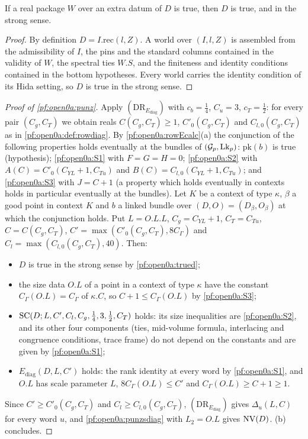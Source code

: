 \begin{lemma}\label{pf:open0a:trued}
If a real package $W$ over an extra datum of $D$ is true, then $D$ is true, and in the strong sense.
\ 
\end{lemma}

\begin{proof}
By definition $D=I.\mathrm{rec}(l,Z)$. A world over $(I,l,Z)$ is assembled from the admissibility of $I$, the pins
and the standard columns contained in the validity of $W$, the spectral ties $W.S$, and the finiteness and identity
conditions contained in the bottom hypotheses. Every world carries the identity condition of its Hida setting, so $D$
is true in the strong sense.
\end{proof}

\begin{proof}[Proof of \cref{pf:open0a:punz}]
Apply $(\mathrm{DR}_{E_{\mathrm{diag}}})$ with $c_b=\frac14$, $C_u=3$, $c_T=\frac12$: for every pair $(C_g,C_T)$ we
obtain reals $C(C_g,C_T)\ge1$, $C'_0(C_g,C_T)$ and $C_{l,0}(C_g,C_T)$ as in \cref{pf:open0a:def:rowdiag}. By
\cref{pf:open0a:rowEcalc}(a) the conjunction of the following properties holds eventually at the bundles of
$(\mathcal G_p,\mathrm{Lk}_p)$: $\mathrm{pk}(b)$ is true (hypothesis); \ref{pf:open0a:S1} with $F=G=H=0$;
\ref{pf:open0a:S2} with $A(C)=C'_0(C_{YL}+1,C_{Tu})$ and $B(C)=C_{l,0}(C_{YL}+1,C_{Tu})$; and \ref{pf:open0a:S3} with
$J=C+1$ (a property which holds eventually in contexts holds in particular eventually at the bundles). Let $K$ be a
context of type $\kappa$, $\beta$ a good point in context $K$ and $b$ a linked bundle over $(D,O)=(D_\beta,O_\beta)$
at which the conjunction holds. Put $L=O.L.L$, $C_g=C_{YL}+1$, $C_T=C_{Tu}$, $C=C(C_g,C_T)$,
$C'=\max(C'_0(C_g,C_T),8C_\Gamma)$ and $C_l=\max(C_{l,0}(C_g,C_T),40)$. Then:
\begin{itemize}
\item $D$ is true in the strong sense by \cref{pf:open0a:trued};
\item the size data $O.L$ of a point in a context of type $\kappa$ have the constant $C_\Gamma(O.L)=C_\Gamma$ of
$\kappa.C$, so $C+1\le C_\Gamma(O.L)$ by \ref{pf:open0a:S3};
\item $\mathrm{SC}(D;L,C',C_l,C_g,\frac14,3,\frac12,C_T)$ holds: its size inequalities are \ref{pf:open0a:S2}, and its
other four components (ties, mid-volume formula, interlacing and congruence conditions, trace frame) do not depend on
the constants and are given by \ref{pf:open0a:S1};
\item $E_{\mathrm{diag}}(D,L,C')$ holds: the rank identity at every word by \ref{pf:open0a:S1}, and $O.L$ has scale
parameter $L$, $8C_\Gamma(O.L)\le C'$ and $C_\Gamma(O.L)\ge C+1\ge1$.
\end{itemize}
Since $C'\ge C'_0(C_g,C_T)$ and $C_l\ge C_{l,0}(C_g,C_T)$, $(\mathrm{DR}_{E_{\mathrm{diag}}})$ gives $\Delta_u(L,C)$ for
every word $u$, and \cref{pf:open0a:punzsdiag} with $L_2=O.L$ gives $\mathrm{NV}(D)$. (b)
concludes.
\end{proof}


